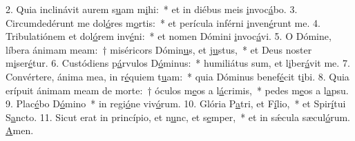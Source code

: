 2. Quia inclinávit aurem s\uline{u}am m\uline{i}hi:~* et in diébus meis \uline{i}nvoc\uline{á}bo.
3. Circumdedérunt me dol\uline{ó}res m\uline{o}rtis:~* et perícula inférni \uline{i}nven\uline{é}runt me.
4. Tribulatiónem et dol\uline{ó}rem inv\uline{é}ni:~* et nomen Dómini \uline{i}nvoc\uline{á}vi.
5. O Dómine, líbera ánimam meam:~† miséricors Dómin\uline{u}s, et j\uline{u}stus,~* et Deus noster m\uline{i}ser\uline{é}tur.
6. Custódiens p\uline{á}rvulos D\uline{ó}minus:~* humiliátus sum, et l\uline{i}ber\uline{á}vit me.
7. Convértere, ánima mea, in r\uline{é}quiem t\uline{u}am:~* quia Dóminus benef\uline{é}cit t\uline{i}bi.
8. Quia erípuit ánimam meam de morte:~† óculos m\uline{e}os a l\uline{á}crimis,~* pedes m\uline{e}os a l\uline{a}psu.
9. Plac\uline{é}bo D\uline{ó}mino~* in regi\uline{ó}ne viv\uline{ó}rum.
10. Glória P\uline{a}tri, et F\uline{í}lio,~* et Spir\uline{í}tui S\uline{a}ncto.
11. Sicut erat in princípio, et n\uline{u}nc, et s\uline{e}mper,~* et in sǽcula sæcul\uline{ó}rum. \uline{A}men.
